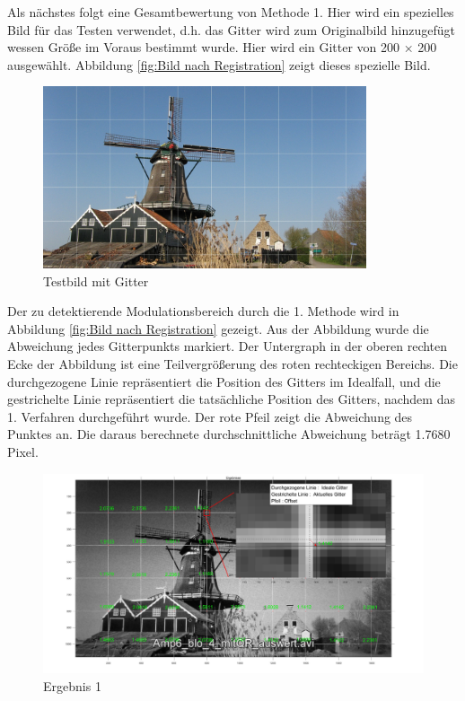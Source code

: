 Als nächstes folgt eine Gesamtbewertung von Methode 1. Hier wird ein spezielles Bild für das Testen verwendet, d.h. das Gitter wird zum Originalbild hinzugefügt wessen Größe im Voraus bestimmt wurde. Hier wird ein Gitter von 200 × 200 ausgewählt. Abbildung \ref{fig:Bild nach Registration} zeigt dieses spezielle Bild.
\begin{figure}[H]
 \centering 
  \includegraphics[keepaspectratio,width=0.85\textwidth]{images/6_Auswertung/windmill_auswert.pdf}
 \caption{Testbild mit Gitter}
 \label{fig:GitterBild}
\end{figure}

Der zu detektierende Modulationsbereich durch die 1. Methode wird in Abbildung \ref{fig:Bild nach Registration} gezeigt. Aus der Abbildung wurde die Abweichung jedes Gitterpunkts markiert. Der Untergraph in der oberen rechten Ecke der Abbildung ist eine Teilvergrößerung des roten rechteckigen Bereichs. Die durchgezogene Linie repräsentiert die Position des Gitters im Idealfall, und die gestrichelte Linie repräsentiert die tatsächliche Position des Gitters, nachdem das 1. Verfahren durchgeführt wurde. Der rote Pfeil zeigt die Abweichung des Punktes an. Die daraus berechnete durchschnittliche Abweichung beträgt 1.7680 Pixel. 

\begin{figure}[H]
 \centering 
  \includegraphics[keepaspectratio,width=1.00\textwidth]{images/6_Auswertung/Ergebnis1.pdf}
 \caption{Ergebnis 1}
 \label{fig:Ergebnis1}
\end{figure}

